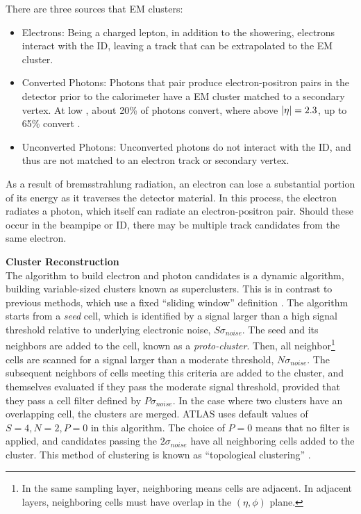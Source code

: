 There are three sources that \gls{EM} clusters:
\begin{itemize}
    \item Electrons: Being a charged lepton, in addition to the showering, electrons interact with the \gls{ID}, leaving a track that can be extrapolated to the \gls{EM} cluster.
    \item Converted Photons: Photons that pair produce electron-positron pairs in the detector prior to the calorimeter have a \gls{EM} cluster matched to a secondary vertex. At low \abseta, about 20\% of photons convert, where above $|\eta|=2.3$, up to 65\% convert \cite{photon-electron-perf}.
    \item Unconverted Photons: Unconverted photons do not interact with the \gls{ID}, and thus are not matched to an electron track or secondary vertex.
\end{itemize}

As a result of bremsstrahlung radiation, an electron can lose a substantial portion of its energy as it traverses the detector material. In this process, the electron radiates a photon, which itself can radiate an electron-positron pair. Should these occur in the beampipe or \gls{ID}, there may be multiple track candidates from the same electron.


\noindent\textbf{Cluster Reconstruction}\\
\indent The algorithm to build electron and photon candidates is a dynamic algorithm, building variable-sized clusters known as superclusters. This is in contrast to previous methods, which use a fixed ``sliding window'' definition \cite{sliding-window}. The algorithm starts from a \textit{seed} cell, which is identified by a signal larger than a high signal threshold relative to underlying electronic noise, $S\sigma_{noise}$. The seed and its neighbors are added to the cell, known as a \textit{proto-cluster}. Then, all neighbor\footnote{In the same sampling layer, neighboring means cells are adjacent. In adjacent layers, neighboring cells must have overlap in the $(\eta,\phi)$ plane.} cells are scanned for a signal larger than a moderate threshold, $N\sigma_{noise}$. The subsequent neighbors of cells meeting this criteria are added to the cluster, and themselves evaluated if they pass the moderate signal threshold, provided that they pass a cell filter defined by $P\sigma_{noise}$. In the case where two clusters have an overlapping cell, the clusters are merged. ATLAS uses default values of $S=4,N=2,P=0$ in this algorithm. The choice of $P=0$ means that no filter is applied, and candidates passing the $2\sigma_{noise}$ have all neighboring cells added to the cluster. This method of clustering is known as  ``topological clustering'' \cite{topo-cluster}. 


